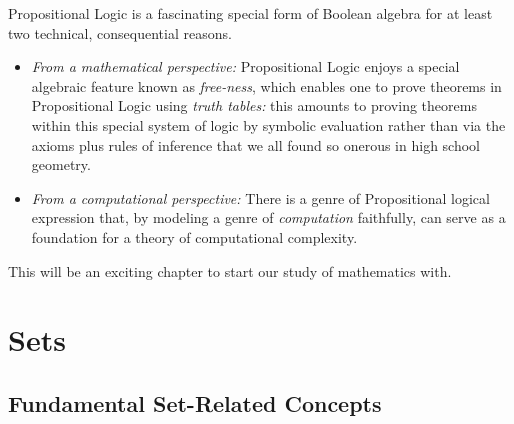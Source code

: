 \begin{itemize}
Propositional Logic is a fascinating special form of Boolean algebra for at least two technical, consequential reasons.
  \begin{itemize}
  \item
{\em From a mathematical perspective:}
Propositional Logic enjoys a special algebraic feature known as {\it free-ness}, which enables one to prove theorems in Propositional Logic using {\em truth tables:} this amounts to proving theorems within this special system of logic by symbolic evaluation rather than via the axioms
plus rules of inference that we all found so onerous in high school geometry.
  \item
{\em From a computational perspective:}
There is a genre of Propositional logical expression that, by modeling a genre of {\em computation} faithfully, can serve as a foundation for a theory of computational complexity.
  \end{itemize}
\end{itemize}

\medskip

This will be an exciting chapter to start our study of mathematics with.

\section{Sets}
\label{sec:sets}

\subsection{Fundamental Set-Related Concepts}
\label{sec:set-concepts}

